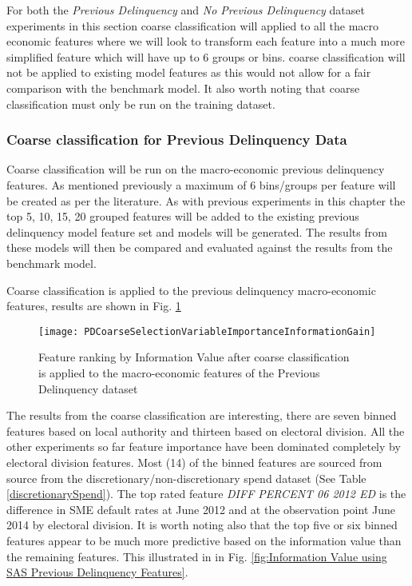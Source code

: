 For both the \textit{Previous Delinquency} and \textit{No Previous Delinquency} dataset experiments in this section coarse classification will applied to all the macro economic features where we will look to transform each feature into a much more simplified feature which will have up to 6 groups or bins. coarse classification will not be applied to existing model features as this would not allow for a fair comparison with the benchmark model. It also worth noting that coarse classification must only be run on the training dataset.


\subsubsection{Coarse classification for Previous Delinquency Data}
Coarse classification will be run on the macro-economic previous delinquency features. As mentioned previously a maximum of 6 bins/groups per feature will be created as per the literature. As with previous experiments in this chapter the top 5, 10, 15, 20 grouped features will be added to the existing previous delinquency model feature set and models will be generated. The results from these models will then be compared and evaluated against the results from the benchmark model.

Coarse classification is applied to the previous delinquency macro-economic features, results are shown in Fig. \ref{fig:PDCoarseSelectionVariableImportanceInformationGain}

\begin{figure}[H]
	\texttt{[image: PDCoarseSelectionVariableImportanceInformationGain]}
	\caption{Feature ranking by Information Value after coarse classification \\is applied to the macro-economic features of the Previous Delinquency dataset}
	\label{fig:PDCoarseSelectionVariableImportanceInformationGain}
\end{figure}

The results from the coarse classification are interesting, there are seven binned features based on local authority and thirteen based on electoral division. All the other experiments so far feature importance have been dominated completely by electoral division features. Most (14) of the binned features are sourced from source from the discretionary/non-discretionary spend dataset  (See Table \ref{discretionarySpend}). The top rated feature \textit{DIFF PERCENT 06 2012 ED} is the difference in SME default rates at June 2012 and at the observation point June 2014 by electoral division. It is worth noting also that the top five or six binned features appear to be much more predictive based on the information value than the remaining features. This illustrated in in Fig. \ref{fig:Information Value using SAS Previous Delinquency Features}.

